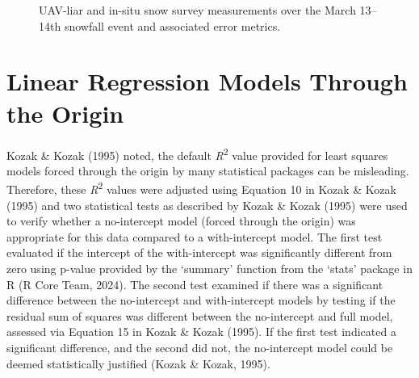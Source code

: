 \documentclass[
  letterpaper,
  DIV=11,
  numbers=noendperiod]{scrartcl}
\begin{document}
\begin{figure}[H]


\caption{\label{fig-lidar-vs-fsd-sd}UAV-liar and in-situ snow survey
measurements over the March 13--14th snowfall event and associated error
metrics.}

\end{figure}%

\section{Linear Regression Models Through the
Origin}\label{linear-regression-models-through-the-origin}

Kozak \& Kozak (1995) noted, the default \emph{R}\textsuperscript{2}
value provided for least squares models forced through the origin by
many statistical packages can be misleading. Therefore, these
\emph{R}\textsuperscript{2} values were adjusted using Equation 10 in
Kozak \& Kozak (1995) and two statistical tests as described by Kozak \&
Kozak (1995) were used to verify whether a no-intercept model (forced
through the origin) was appropriate for this data compared to a
with-intercept model. The first test evaluated if the intercept of the
with-intercept was significantly different from zero using p-value
provided by the `summary' function from the `stats' package in R (R Core
Team, 2024). The second test examined if there was a significant
difference between the no-intercept and with-intercept models by testing
if the residual sum of squares was different between the no-intercept
and full model, assessed via Equation 15 in Kozak \& Kozak (1995). If
the first test indicated a significant difference, and the second did
not, the no-intercept model could be deemed statistically justified
(Kozak \& Kozak, 1995).
\end{document}
